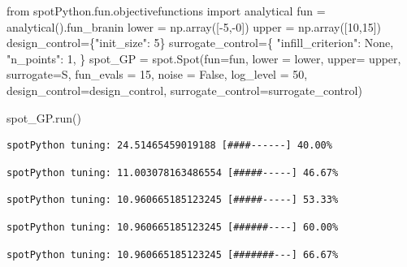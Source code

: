 \documentclass[
  letterpaper,
  DIV=11,
  numbers=noendperiod]{scrreprt}
\newenvironment{Shaded}{\begin{snugshade}}{\end{snugshade}}
\newcommand{\DecValTok}[1]{\textcolor[rgb]{0.68,0.00,0.00}{#1}}
\newcommand{\ImportTok}[1]{\textcolor[rgb]{0.00,0.46,0.62}{#1}}
\newcommand{\NormalTok}[1]{\textcolor[rgb]{0.00,0.23,0.31}{#1}}
\newcommand{\OperatorTok}[1]{\textcolor[rgb]{0.37,0.37,0.37}{#1}}
\newcommand{\StringTok}[1]{\textcolor[rgb]{0.13,0.47,0.30}{#1}}
\newcommand{\VariableTok}[1]{\textcolor[rgb]{0.07,0.07,0.07}{#1}}
\begin{document}
\begin{Shaded}
\begin{Highlighting}[]
\ImportTok{from}\NormalTok{ spotPython.fun.objectivefunctions }\ImportTok{import}\NormalTok{ analytical}
\NormalTok{fun }\OperatorTok{=}\NormalTok{ analytical().fun\_branin}
\NormalTok{lower }\OperatorTok{=}\NormalTok{ np.array([}\OperatorTok{{-}}\DecValTok{5}\NormalTok{,}\OperatorTok{{-}}\DecValTok{0}\NormalTok{])}
\NormalTok{upper }\OperatorTok{=}\NormalTok{ np.array([}\DecValTok{10}\NormalTok{,}\DecValTok{15}\NormalTok{])}
\NormalTok{design\_control}\OperatorTok{=}\NormalTok{\{}\StringTok{"init\_size"}\NormalTok{: }\DecValTok{5}\NormalTok{\}}
\NormalTok{surrogate\_control}\OperatorTok{=}\NormalTok{\{}
            \StringTok{"infill\_criterion"}\NormalTok{: }\VariableTok{None}\NormalTok{,}
            \StringTok{"n\_points"}\NormalTok{: }\DecValTok{1}\NormalTok{,}
\NormalTok{        \}}
\NormalTok{spot\_GP }\OperatorTok{=}\NormalTok{ spot.Spot(fun}\OperatorTok{=}\NormalTok{fun, lower }\OperatorTok{=}\NormalTok{ lower, upper}\OperatorTok{=}\NormalTok{ upper, surrogate}\OperatorTok{=}\NormalTok{S, }
\NormalTok{                    fun\_evals }\OperatorTok{=} \DecValTok{15}\NormalTok{, noise }\OperatorTok{=} \VariableTok{False}\NormalTok{, log\_level }\OperatorTok{=} \DecValTok{50}\NormalTok{,}
\NormalTok{                    design\_control}\OperatorTok{=}\NormalTok{design\_control,}
\NormalTok{                    surrogate\_control}\OperatorTok{=}\NormalTok{surrogate\_control)}

\NormalTok{spot\_GP.run()}
\end{Highlighting}
\end{Shaded}

\begin{verbatim}
spotPython tuning: 24.51465459019188 [####------] 40.00% 
\end{verbatim}

\begin{verbatim}
spotPython tuning: 11.003078163486554 [#####-----] 46.67% 
\end{verbatim}

\begin{verbatim}
spotPython tuning: 10.960665185123245 [#####-----] 53.33% 
\end{verbatim}

\begin{verbatim}
spotPython tuning: 10.960665185123245 [######----] 60.00% 
\end{verbatim}

\begin{verbatim}
spotPython tuning: 10.960665185123245 [#######---] 66.67% 
\end{verbatim}
\end{document}
